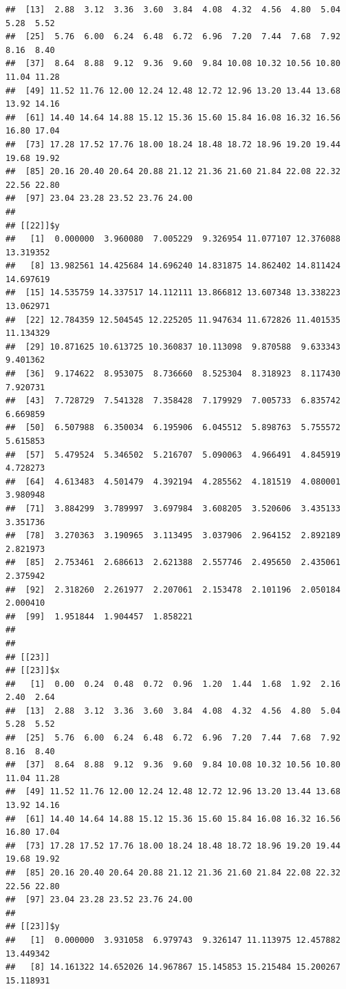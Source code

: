 \documentclass[
  ignorenonframetext,
]{beamer}
\begin{document}
\begin{frame}[fragile]{}
\begin{verbatim}
##  [13]  2.88  3.12  3.36  3.60  3.84  4.08  4.32  4.56  4.80  5.04  5.28  5.52
##  [25]  5.76  6.00  6.24  6.48  6.72  6.96  7.20  7.44  7.68  7.92  8.16  8.40
##  [37]  8.64  8.88  9.12  9.36  9.60  9.84 10.08 10.32 10.56 10.80 11.04 11.28
##  [49] 11.52 11.76 12.00 12.24 12.48 12.72 12.96 13.20 13.44 13.68 13.92 14.16
##  [61] 14.40 14.64 14.88 15.12 15.36 15.60 15.84 16.08 16.32 16.56 16.80 17.04
##  [73] 17.28 17.52 17.76 18.00 18.24 18.48 18.72 18.96 19.20 19.44 19.68 19.92
##  [85] 20.16 20.40 20.64 20.88 21.12 21.36 21.60 21.84 22.08 22.32 22.56 22.80
##  [97] 23.04 23.28 23.52 23.76 24.00
## 
## [[22]]$y
##   [1]  0.000000  3.960080  7.005229  9.326954 11.077107 12.376088 13.319352
##   [8] 13.982561 14.425684 14.696240 14.831875 14.862402 14.811424 14.697619
##  [15] 14.535759 14.337517 14.112111 13.866812 13.607348 13.338223 13.062971
##  [22] 12.784359 12.504545 12.225205 11.947634 11.672826 11.401535 11.134329
##  [29] 10.871625 10.613725 10.360837 10.113098  9.870588  9.633343  9.401362
##  [36]  9.174622  8.953075  8.736660  8.525304  8.318923  8.117430  7.920731
##  [43]  7.728729  7.541328  7.358428  7.179929  7.005733  6.835742  6.669859
##  [50]  6.507988  6.350034  6.195906  6.045512  5.898763  5.755572  5.615853
##  [57]  5.479524  5.346502  5.216707  5.090063  4.966491  4.845919  4.728273
##  [64]  4.613483  4.501479  4.392194  4.285562  4.181519  4.080001  3.980948
##  [71]  3.884299  3.789997  3.697984  3.608205  3.520606  3.435133  3.351736
##  [78]  3.270363  3.190965  3.113495  3.037906  2.964152  2.892189  2.821973
##  [85]  2.753461  2.686613  2.621388  2.557746  2.495650  2.435061  2.375942
##  [92]  2.318260  2.261977  2.207061  2.153478  2.101196  2.050184  2.000410
##  [99]  1.951844  1.904457  1.858221
## 
## 
## [[23]]
## [[23]]$x
##   [1]  0.00  0.24  0.48  0.72  0.96  1.20  1.44  1.68  1.92  2.16  2.40  2.64
##  [13]  2.88  3.12  3.36  3.60  3.84  4.08  4.32  4.56  4.80  5.04  5.28  5.52
##  [25]  5.76  6.00  6.24  6.48  6.72  6.96  7.20  7.44  7.68  7.92  8.16  8.40
##  [37]  8.64  8.88  9.12  9.36  9.60  9.84 10.08 10.32 10.56 10.80 11.04 11.28
##  [49] 11.52 11.76 12.00 12.24 12.48 12.72 12.96 13.20 13.44 13.68 13.92 14.16
##  [61] 14.40 14.64 14.88 15.12 15.36 15.60 15.84 16.08 16.32 16.56 16.80 17.04
##  [73] 17.28 17.52 17.76 18.00 18.24 18.48 18.72 18.96 19.20 19.44 19.68 19.92
##  [85] 20.16 20.40 20.64 20.88 21.12 21.36 21.60 21.84 22.08 22.32 22.56 22.80
##  [97] 23.04 23.28 23.52 23.76 24.00
## 
## [[23]]$y
##   [1]  0.000000  3.931058  6.979743  9.326147 11.113975 12.457882 13.449342
##   [8] 14.161322 14.652026 14.967867 15.145853 15.215484 15.200267 15.118931

\end{verbatim}
\end{frame}
\end{document}
